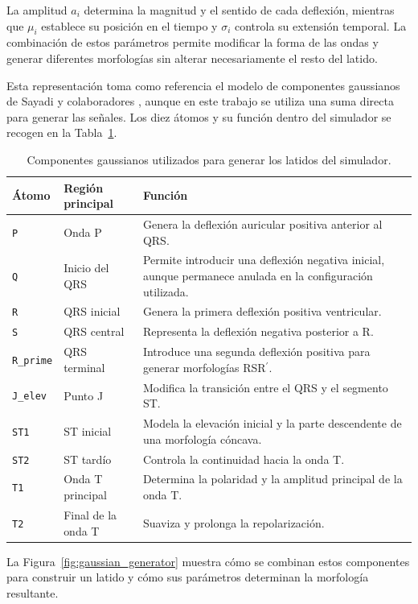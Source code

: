 La amplitud \(a_i\) determina la magnitud y el sentido de cada deflexión, mientras que \(\mu_i\) establece su posición en el tiempo y \(\sigma_i\) controla su extensión temporal. La combinación de estos parámetros permite modificar la forma de las ondas y generar diferentes morfologías sin alterar necesariamente el resto del latido.

Esta representación toma como referencia el modelo de componentes gaussianos de Sayadi y colaboradores \cite{sayadi2010}, aunque en este trabajo se utiliza una suma directa para generar las señales. Los diez átomos y su función dentro del simulador se recogen en la Tabla~\ref{tab:atomos}.

\begin{table}[H]
\centering
\small
\begin{tabularx}{\textwidth}{p{2.2cm} p{3.8cm} X}
\toprule
\textbf{Átomo} & \textbf{Región principal} & \textbf{Función} \\
\midrule
\texttt{P} & Onda P & Genera la deflexión auricular positiva anterior al QRS. \\
\texttt{Q} & Inicio del QRS & Permite introducir una deflexión negativa inicial, aunque permanece anulada en la configuración utilizada. \\
\texttt{R} & QRS inicial & Genera la primera deflexión positiva ventricular. \\
\texttt{S} & QRS central & Representa la deflexión negativa posterior a R. \\
\texttt{R\_prime} & QRS terminal & Introduce una segunda deflexión positiva para generar morfologías RSR$^\prime$. \\
\texttt{J\_elev} & Punto J & Modifica la transición entre el QRS y el segmento ST. \\
\texttt{ST1} & ST inicial & Modela la elevación inicial y la parte descendente de una morfología cóncava. \\
\texttt{ST2} & ST tardío & Controla la continuidad hacia la onda T. \\
\texttt{T1} & Onda T principal & Determina la polaridad y la amplitud principal de la onda T. \\
\texttt{T2} & Final de la onda T & Suaviza y prolonga la repolarización. \\
\bottomrule
\end{tabularx}
\caption{Componentes gaussianos utilizados para generar los latidos del simulador.}
\label{tab:atomos}
\end{table}

La Figura~\ref{fig:gaussian_generator} muestra cómo se combinan estos componentes para construir un latido y cómo sus parámetros determinan la morfología resultante.

